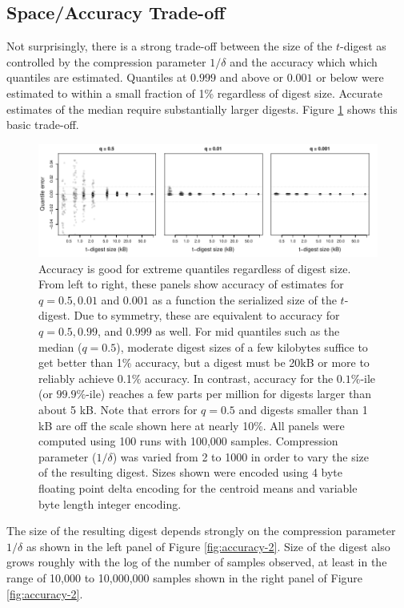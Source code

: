 \documentclass[11pt]{amsart}
\begin{document}
\subsection{Space/Accuracy Trade-off}
Not surprisingly, there is a strong trade-off between the size of the $t$-digest as controlled by the compression parameter $1/\delta$ and the accuracy which which quantiles are estimated.  Quantiles at $0.999$ and above or $0.001$ or below were estimated to within a small fraction of 1\% regardless of digest size.  Accurate estimates of the median require substantially larger digests.  Figure \ref{fig:accuracy-1} shows this basic trade-off.

\begin{figure}[htb] %
   \centering
   \includegraphics[width=6in]{error-scaling.pdf} 
   \caption{Accuracy is good for extreme quantiles regardless of digest size.  From left to right, these panels show accuracy of estimates for $q=0.5, 0.01$ and $0.001$ as a function the serialized size of the $t$-digest.  Due to symmetry, these are equivalent to accuracy for $q=0.5, 0.99$, and $0.999$ as well. For mid quantiles such as the median ($q=0.5$), moderate digest sizes of a few kilobytes suffice to get better than 1\% accuracy, but a digest must be 20kB or more to reliably achieve 0.1\% accuracy.  In contrast, accuracy for the $0.1\%$-ile (or $99.9\%$-ile) reaches a few parts per million for digests larger than about 5 kB.  Note that errors for $q=0.5$ and digests smaller than 1 kB are off the scale shown here at nearly 10\%.  All panels were computed using 100 runs with 100,000 samples.  Compression parameter ($1/\delta$) was varied from 2 to 1000 in order to vary the size of the resulting digest.  Sizes shown were encoded using 4 byte floating point delta encoding for the centroid means and variable byte length integer encoding.}
   \label{fig:accuracy-1}
\end{figure}
The size of the resulting digest depends strongly on the compression parameter $1/\delta$ as shown in the left panel of Figure \ref{fig:accuracy-2}.  Size of the digest also grows roughly with the log of the number of samples observed, at least in the range of 10,000 to 10,000,000 samples shown in the right panel of Figure \ref{fig:accuracy-2}.
\end{document}
